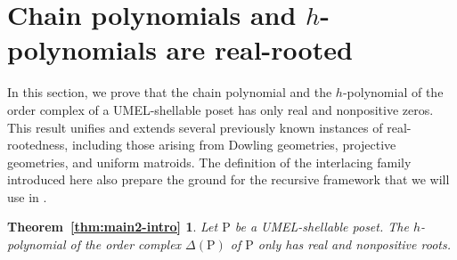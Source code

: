 \documentclass[11pt,a4paper]{amsart}
\theoremstyle{results}
\theoremstyle{definitions}
\def\P{\mathbb{P}}
\renewcommand{\P}{\mathrm{P}}
\begin{document}
\section{Chain polynomials and \texorpdfstring{$h$}{h}-polynomials are real-rooted
}
\label{sec:h-RR}
In this section, we prove that the chain polynomial and the $h$-polynomial of the order complex of a UMEL-shellable poset has only real and nonpositive zeros. This result unifies and extends several previously known instances of real-rootedness, including those arising from Dowling geometries, projective geometries, and uniform matroids. The definition of the interlacing family introduced here also prepare the ground for the recursive framework that we will use in .

\newtheorem*{thm:intro2}{Theorem~\ref{thm:main2-intro}}
\begin{thm:intro2}
    {\itshape
Let $\P$ be a UMEL-shellable poset. The $h$-polynomial of the order complex $\Delta(\P)$ of $\P$ only has real and nonpositive roots.} 
\end{thm:intro2}
\end{document}
